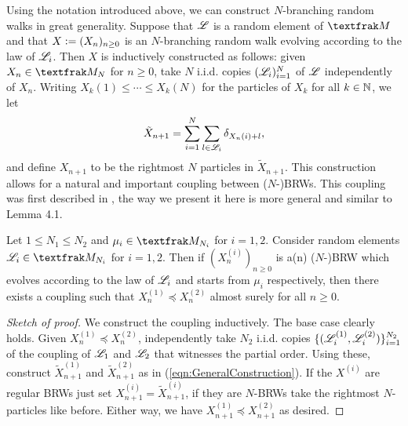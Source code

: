 Using the notation introduced above, we can construct $N$-branching random walks in great generality. Suppose that $\mathscr{L}$ is a random element of $\frak{M}$ and that $X \vcentcolon= (X_n)_{n\geq0}$ is an $N$-branching random walk evolving according to the law of $\mathscr{L}_i$. Then $X$ is inductively constructed as follows: given $X_n \in \frak{M}_N$ for $n \geq 0$, take $N$ i.i.d. copies $(\mathscr{L}_i)^N_{i=1}$ of $\mathscr{L}$ independently of $X_n$. Writing $X_k(1) \leq \cdots \leq X_k(N)$ for the particles of $X_k$ for all $k \in \mathbb{N}$, we let 
\begin{equation}\label{eqn:GeneralConstruction}
\tilde{X}_{n+1} = \sum\limits^N_{i=1} \sum\limits_{l \in \mathscr{L}_i} \delta_{X_n(i) +  l}, 
\end{equation}
and define $X_{n+1}$ to be the rightmost $N$ particles in $\tilde{X}_{n+1}$. This construction allows for a natural and important coupling between ($N$-)BRWs. This coupling was first described in \cite{exptails}, the way we present it here is more general and similar to \cite{mallein2018n} Lemma 4.1.

\begin{lemma}\label{lem:monotonicity}
Let $1 \leq N_1 \leq N_2$ and $\mu_i \in \frak{M}_{N_i}$ for $i = 1,2$. Consider random elements $\scr{L}_i \in \frak{M}_{N_i}$ for $i = 1,2$. Then if $(X^{(i)}_n)_{n\geq0}$ is a(n) ($N$-)BRW which evolves according to the law of $\mathscr{L}_i$ and starts from $\mu_i$ respectively, then there exists a coupling such that $X^{(1)}_n \preceq X^{(2)}_n$ almost surely for all $n \geq 0$. 
\end{lemma}

\begin{proof}[Sketch of proof]
We construct the coupling inductively. The base case clearly holds. Given $X^{(1)}_n \preceq X^{(2)}_n$, independently take $N_2$ i.i.d. copies $\{(\mathscr{L}^{(1)}_i, \mathscr{L}^{(2)}_i)\}^{N_2}_{i=1}$ of the coupling of $\mathscr{L}_1$ and $\mathscr{L}_2$ that witnesses the partial order. Using these, construct $\tilde{X}^{(1)}_{n+1}$ and $\tilde{X}^{(2)}_{n+1}$ as in (\ref{eqn:GeneralConstruction}). If the $X^{(i)}$ are regular BRWs just set $X^{(i)}_{n+1} = \tilde{X}^{(i)}_{n+1}$, if they are $N$-BRWs take the rightmost $N$-particles like before. Either way, we have $X^{(1)}_{n+1} \preceq X^{(2)}_{n+1}$ as desired. 
\end{proof}	


